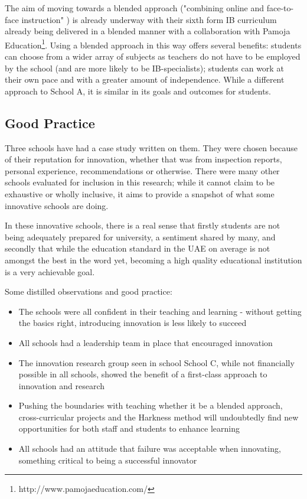 The aim of moving towards a blended approach ("combining online and face-to-face instruction" \cite{bonk2006handbook}) is already underway with their sixth form IB curriculum already being delivered in a blended manner with a collaboration with Pamoja Education\footnote{http://www.pamojaeducation.com/}. Using a blended approach in this way offers several benefits: students can choose from a wider array of subjects as teachers do not have to be employed by the school (and are more likely to be IB-specialists); students can work at their own pace and with a greater amount of independence. While a different approach to School A, it is similar in its goals and outcomes for students.

\subsection{Good Practice}
Three schools have had a case study written on them. They were chosen because of their reputation for innovation, whether that was from inspection reports, personal experience, recommendations or otherwise. There were many other schools evaluated for inclusion in this research; while it cannot claim to be exhaustive or wholly inclusive, it aims to provide a snapshot of what some innovative schools are doing. 

In these innovative schools, there is a real sense that firstly students are not being adequately prepared for university, a sentiment shared by many, \citep{Ali2016,Moussly2012} and secondly that while the education standard in the UAE on average is not amongst the best in the word yet, \cite{2013} becoming a high quality educational institution is a very achievable goal.

Some distilled observations and good practice:

\begin{itemize}
\item The schools were all confident in their teaching and learning - without getting the basics right, introducing innovation is less likely to succeed
\item All schools had a leadership team in place that encouraged innovation
\item The innovation research group seen in school School C, while not financially possible in all schools, showed the benefit of a first-class approach to innovation and research
\item Pushing the boundaries with teaching whether it be a blended approach, cross-curricular projects and the Harkness method will undoubtedly find new opportunities for both staff and students to enhance learning
\item All schools had an attitude that failure was acceptable when innovating, something critical to being a successful innovator

\end{itemize}






